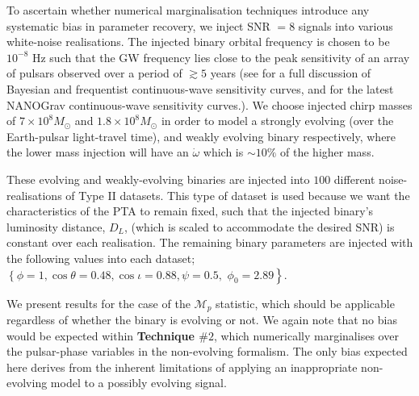 \documentclass[prd,twocolumn,showpacs,nofootinbib]{revtex4}
\begin{document}
To ascertain whether numerical marginalisation techniques introduce any systematic bias in parameter recovery, we inject SNR $=8$ signals into various white-noise realisations. The injected binary orbital frequency is chosen to be $10^{-8}$ Hz such that the GW frequency lies close to the peak sensitivity of an array of pulsars observed over a period of $\gtrsim 5$ years (see \citet{moore-2014} for a full discussion of Bayesian and frequentist continuous-wave sensitivity curves, and \citet{nanogravCW_2014} for the latest NANOGrav continuous-wave sensitivity curves.). 
We choose injected chirp masses of $7\times 10^8M_{\odot}$ and $1.8\times 10^8M_{\odot}$ in order to model a strongly evolving (over the Earth-pulsar light-travel time), and weakly evolving binary respectively, where the lower mass injection will have an $\dot\omega$ which is $\sim 10\%$ of the higher mass.

These evolving and weakly-evolving binaries are injected into $100$ different noise-realisations of Type II datasets. This type of dataset is used because we want the characteristics of the PTA to remain fixed, such that the injected binary's luminosity distance, $D_L$, (which is scaled to accommodate the desired SNR) is constant over each realisation. The remaining binary parameters are injected with the following values into each dataset; $\left\{\phi=1,\cos\theta=0.48,\cos\iota=0.88,\psi=0.5,\right.$ $\left.\phi_0=2.89\right\}$. %

We present results for the case of the {\bf $\mathcal{M}_p$} statistic, which should be applicable regardless of whether the binary is evolving or not. We again note that no bias would be expected within {\bf Technique $\#2$}, which numerically marginalises over the pulsar-phase variables in the non-evolving formalism. The only bias expected here derives from the inherent limitations of applying an inappropriate non-evolving model to a possibly evolving signal. 

\end{document}
